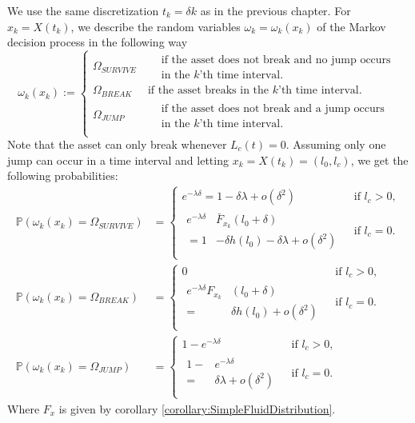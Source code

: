 We use the same discretization $t_k=\delta k$ as in the previous chapter.
For $x_k=X(t_k)$, we describe the random variables $\omega_k=\omega_k(x_k)$ of the Markov decision process in the following way
\[
\omega_k(x_k):=\begin{cases}
\Omega_{SURVIVE}&\ \begin{split}&\text{if the asset does not break and no jump occurs}\\
&\text{in the $k$'th time interval.}\end{split}\\
\Omega_{BREAK}&\ \text{if the asset breaks in the $k$'th time interval.}\\
\Omega_{JUMP}&\ \begin{split}&\text{if the asset does not break and a jump occurs}\\
&\text{in the $k$'th time interval.}\end{split}\\
\end{cases}
\]
Note that the asset can only break whenever $L_c(t)=0$.
Assuming only one jump can occur in a time interval and letting $x_k=X(t_k)=(l_0,l_c)$, we get the following probabilities:
\[
\begin{split}
\mathbb{P}(\omega_k(x_k)=\Omega_{SURVIVE})&=\begin{cases}
e^{-\lambda \delta}=1-\delta\lambda+o(\delta^2)&\text{ if }l_c>0,\\
\begin{split}
e^{-\lambda \delta} & \bar{F}_{x_k}(l_0+\delta)\\
=1&-\delta h(l_0)-\delta\lambda+o(\delta^2)
\end{split}&\text{ if }l_c=0.\\
\end{cases}\\
\mathbb{P}(\omega_k(x_k)=\Omega_{BREAK})&=\begin{cases}
0&\text{ if }l_c>0,\\
\begin{split}
e^{-\lambda \delta}F_{x_k}&(l_0+\delta)\\
=&\delta h(l_0)+o(\delta^2)
\end{split}&\text{ if }l_c=0.\\
\end{cases}\\
\mathbb{P}(\omega_k(x_k)=\Omega_{JUMP})&=\begin{cases}
1-e^{-\lambda \delta} & \text{ if }l_c>0,\\
\begin{split}
1-&e^{-\lambda \delta}\\
=&\delta\lambda+o(\delta^2)
\end{split}&\text{ if }l_c=0.\\
\end{cases}
\end{split}
\]
Where $F_x$ is given by corollary \ref{corollary:SimpleFluidDistribution}.

